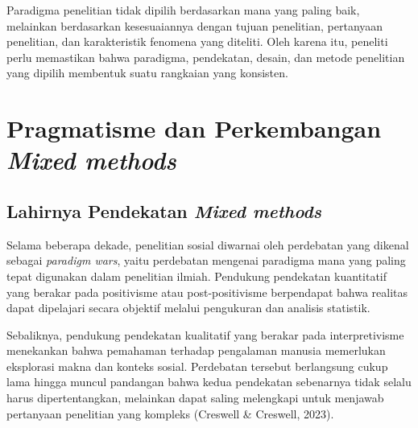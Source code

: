 \documentclass[
  indonesian,
  letterpaper,
  DIV=11,
  numbers=noendperiod]{scrreprt}
\begin{document}
\begin{tcolorbox}[enhanced jigsaw, colframe=quarto-callout-tip-color-frame, toptitle=1mm, breakable, leftrule=.75mm, arc=.35mm, toprule=.15mm, colback=white, colbacktitle=quarto-callout-tip-color!10!white, bottomtitle=1mm, bottomrule=.15mm, titlerule=0mm, title=\textcolor{quarto-callout-tip-color}{\faLightbulb}\hspace{0.5em}{Tips Memilih Paradigma}, coltitle=black, left=2mm, opacitybacktitle=0.6, opacityback=0, rightrule=.15mm]

Paradigma penelitian tidak dipilih berdasarkan mana yang paling baik,
melainkan berdasarkan kesesuaiannya dengan tujuan penelitian, pertanyaan
penelitian, dan karakteristik fenomena yang diteliti. Oleh karena itu,
peneliti perlu memastikan bahwa paradigma, pendekatan, desain, dan
metode penelitian yang dipilih membentuk suatu rangkaian yang konsisten.

\end{tcolorbox}

\section{\texorpdfstring{Pragmatisme dan Perkembangan \emph{Mixed
methods}}{Pragmatisme dan Perkembangan Mixed methods}}\label{pragmatisme-dan-perkembangan-mixed-methods}

\subsection{\texorpdfstring{Lahirnya Pendekatan \emph{Mixed
methods}}{Lahirnya Pendekatan Mixed methods}}\label{lahirnya-pendekatan-mixed-methods}

Selama beberapa dekade, penelitian sosial diwarnai oleh perdebatan yang
dikenal sebagai \emph{paradigm wars}, yaitu perdebatan mengenai
paradigma mana yang paling tepat digunakan dalam penelitian ilmiah.
Pendukung pendekatan kuantitatif yang berakar pada positivisme atau
post-positivisme berpendapat bahwa realitas dapat dipelajari secara
objektif melalui pengukuran dan analisis statistik.

Sebaliknya, pendukung pendekatan kualitatif yang berakar pada
interpretivisme menekankan bahwa pemahaman terhadap pengalaman manusia
memerlukan eksplorasi makna dan konteks sosial. Perdebatan tersebut
berlangsung cukup lama hingga muncul pandangan bahwa kedua pendekatan
sebenarnya tidak selalu harus dipertentangkan, melainkan dapat saling
melengkapi untuk menjawab pertanyaan penelitian yang kompleks (Creswell
\& Creswell, 2023).
\end{document}
